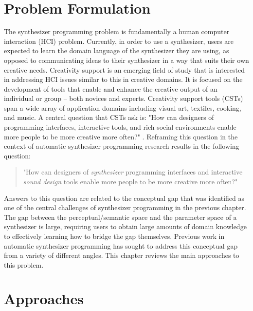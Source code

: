 \section{Problem Formulation}
The synthesizer programming problem is fundamentally a human computer interaction (HCI) problem. Currently, in order to use a synthesizer, users are expected to learn the domain language of the synthesizer they are using, as opposed to communicating ideas to their synthesizer in a way that suits their own creative needs. Creativity support is an emerging field of study that is interested in addressing HCI issues similar to this in creative domains. It is focused on the development of tools that enable and enhance the creative output of an individual or group -- both novices and experts. Creativity support tools (CSTs) \cite{shneiderman2007creativity} span a wide array of application domains including visual art, textiles, cooking, and music. A central question that CSTs ask is: "How can designers of programming interfaces, interactive tools, and rich social environments enable more people to be more creative more often?" \cite{shneiderman2007creativity}. Reframing this question in the context of automatic synthesizer programming research results in the following question:
\begin{quote}
    "How can designers of \textit{synthesizer} programming interfaces and interactive \textit{sound design} tools enable more people to be more creative more often?"
\end{quote}

Answers to this question are related to the conceptual gap that was identified as one of the central challenges of synthesizer programming in the previous chapter. The gap between the perceptual/semantic space and the parameter space of a synthesizer is large, requiring users to obtain large amounts of domain knowledge to effectively learning how to bridge the gap themselves. Previous work in automatic synthesizer programming has sought to address this conceptual gap from a variety of different angles. This chapter reviews the main approaches to this problem.

\section{Approaches}

